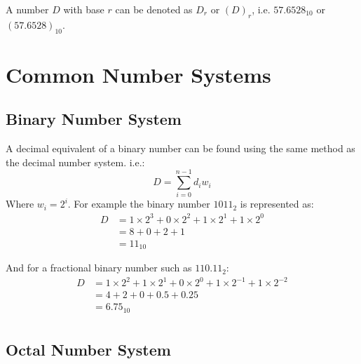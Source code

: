 \documentclass[12pt letter]{report}
\begin{document}
A number $D$ with base $r$ can be denoted as $D_r$ or $ \left( D \right)_r $, i.e. $57.6528_{10}$ or $(57.6528)_{10}$.

\chapter{Common Number Systems}

\section{Binary Number System}


A decimal equivalent of a binary number can be found using the same method as the decimal number system. i.e.:
\[
  D = \displaystyle\sum_{i=0}^{n-1} d_i w_i
\]
Where $w_i = 2^{i}$. For example the binary number $1011_2$ is represented as:
\begin{align*}
  D & = 1 \times 2^{3} + 0 \times 2^{2} + 1 \times 2^{1} + 1 \times 2^{0} \\
    & = 8 + 0 + 2 + 1                                                     \\
    & =  11_{10}
\end{align*}

And for a fractional binary number such as $110.11_2$:
\begin{align*}
  D & = 1 \times 2^{2} + 1 \times 2^{1} + 0 \times 2^{0} + 1\times 2^{-1} + 1 \times 2^{-2} \\
    & = 4 + 2 + 0 + 0.5 + 0.25                                                              \\
    & = 6.75_{10}                                                                           \\
\end{align*}

\section{Octal Number System}

\end{document}
